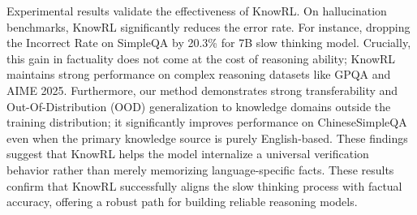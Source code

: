 Experimental results validate the effectiveness of KnowRL. 
On hallucination benchmarks, KnowRL significantly reduces the error rate. 
For instance, dropping the Incorrect Rate on SimpleQA by 20.3\% for 7B slow thinking model. 
Crucially, this gain in factuality does not come at the cost of reasoning ability; KnowRL maintains strong performance on complex reasoning datasets like GPQA and AIME 2025. 
Furthermore, our method demonstrates strong transferability and Out-Of-Distribution (OOD) generalization to knowledge domains outside the training distribution; it significantly improves performance on ChineseSimpleQA~\citep{he2024chinese} even when the primary knowledge source is purely English-based. 
These findings suggest that KnowRL helps the model internalize a universal verification behavior rather than merely memorizing language-specific facts.  
These results confirm that KnowRL successfully aligns the slow thinking process with factual accuracy, offering a robust path for building reliable reasoning models.






